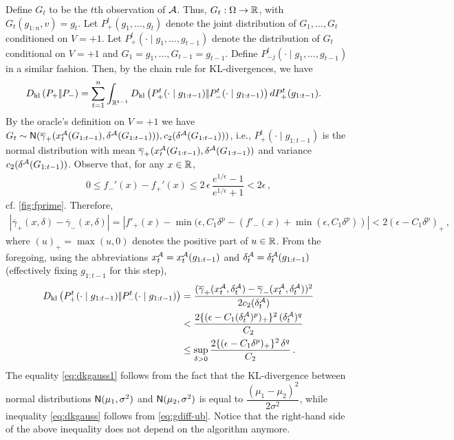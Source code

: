 Define $G_t$ to be the $t$th observation of $\mathcal{A}$. Thus, $G_t:\Omega \to \mathbb{R}$, with $G_t( g_{1:n}, v) = g_t$.
Let $P_+^t(g_1,\dots,g_t)$ denote the joint distribution of $G_1,\dots,G_t$ conditioned on $V=+1$.
Let $P_{+}^t(\cdot\mid g_1,\ldots,g_{t-1})$ denote the distribution of $G_t$ conditional on $V=+1$ and $G_1=g_1,\ldots,G_{t-1}=g_{t-1}$. Define  $P_{-j}^t(\cdot\mid g_1,\ldots,g_{t-1})$ in a similar fashion.
Then, by the chain rule for KL-divergences, we have
\begin{align}
\label{eq:dklchain}
&D_{\rm kl}\left({P_{+}} |\!| {P_{-}} \right)= \sum_{t=1}^n \int_{\mathbb{R}^{t-1}} D_{\rm kl}\left({P_{+}^t(\cdot\mid g_{1:t-1})} |\!| {P_{-}^t(\cdot\mid g_{1:t-1})} \right) d P_{+}^t( g_{1:t-1}).
\end{align}
By the oracle's definition on $V=+1$ we have
$G_t \sim  \mathsf{N}(\overline{\gamma}_{+}(x^{\mathcal{A}}_t(G_{1:t-1}),\delta^{\mathcal{A}}(G_{1:t-1}))),c_2(\delta^{\mathcal{A}}(G_{1:t-1})))$, i.e., 
$P_{+}^t(\cdot\mid g_{1:t-1})$ is the normal distribution with mean 
$\overline{\gamma}_{+}(x^{\mathcal{A}}_t(G_{1:t-1}),\delta^{\mathcal{A}}(G_{1:t-1}))$ and variance $c_2(\delta^{\mathcal{A}}(G_{1:t-1}))$.
Observe that, for any $x\in \mathbb{R}$, 
\begin{align*}
0 \le f_-'(x) - f_+'(x) \le 2\,\epsilon \,\dfrac{e^{1/\epsilon}-1}{e^{1/\epsilon}+1} < 2\epsilon \,,
\end{align*}
cf. \cref{fig:fprime}.
Therefore,
\begin{align}
 |\overline{\gamma}_+(x,\delta) - \overline{\gamma}_-(x,\delta)| 
 = | f'_+(x) - \min(\epsilon,C_1 \delta^p - (f'_-(x)+\min(\epsilon,C_1 \delta^p)) | 
 < 2 (\epsilon - C_1 \delta^p)_+\,,
 \label{eq:gdiff-ub}
\end{align}
where $(u)_+ = \max(u,0)$ denotes the positive part of $u\in \mathbb{R}$.
From the foregoing, using the abbreviations $x_t^{\mathcal{A}} = x^{\mathcal{A}}_t(g_{1:t-1})$ and $\delta_t^{\mathcal{A}} = \delta^{\mathcal{A}}_t(g_{1:t-1})$ (effectively fixing $g_{1:t-1}$ for this step),
\begin{align}
D_{\rm kl}\left({P_{+}^t(\cdot\mid g_{1:t-1})} |\!| {P_{-}^t(\cdot\mid g_{1:t-1})} \right)
& =\dfrac{(\overline{\gamma}_{+}(x_t^{\mathcal{A}},\delta_t^{\mathcal{A}}) - \overline{\gamma}_{-}(x_t^{\mathcal{A}},\delta_t^{\mathcal{A}}))^2}{2 c_2(\delta^{\mathcal{A}}_t)}
				\label{eq:dkgauss1}\\
& < \dfrac{2\{(\epsilon-C_1(\delta^{\mathcal{A}}_t)^p)_+\}^2\,(\delta^{\mathcal{A}}_t)^q}{C_2}\label{eq:dkgauss}\\
& \le  \sup_{\delta>0} \dfrac{2\{(\epsilon-C_1\delta^p)_+\}^2\,\delta^q}{C_2} \label{eq:supdelta}\,.
\end{align}
The equality \eqref{eq:dkgauss1} follows from the fact that the KL-divergence between normal distributions $\mathsf{N}(\mu_1,\sigma^2)$ and $\mathsf{N}(\mu_2,\sigma^2)$ is equal to $\dfrac{(\mu_1 - \mu_2)^2}{2 \sigma^2}$, while inequality \eqref{eq:dkgauss} follows from \eqref{eq:gdiff-ub}. Notice that the right-hand side of the above inequality does not depend on the algorithm anymore.

